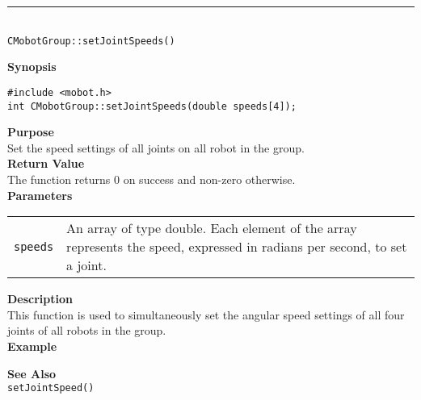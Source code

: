 \noindent
\vspace{5pt}
\rule{4.5in}{0.015in}\\
\noindent
{\LARGE \texttt{CMobotGroup::setJointSpeeds()}}\\
{}

\noindent
{\bf Synopsis}
\vspace{-8pt}
\begin{verbatim}
#include <mobot.h>
int CMobotGroup::setJointSpeeds(double speeds[4]);
\end{verbatim}

\noindent
{\bf Purpose}\\
Set the speed settings of all joints on all robot in the group.\\

\noindent
{\bf Return Value}\\
The function returns 0 on success and non-zero otherwise.\\

\noindent
{\bf Parameters}
\vspace{-0.1in}
\begin{description}
\item               
\begin{tabular}{p{10 mm}p{145 mm}}
\texttt{speeds} & An array of type double. Each element of the array
represents the speed, expressed in radians per second, to set a joint. \\
\end{tabular}
\end{description}

\noindent
{\bf Description}\\
This function is used to simultaneously set the angular speed settings of
all four joints of all robots in the group. \\

\noindent
{\bf Example}\\
\noindent

\noindent
{\bf See Also}\\
\texttt{setJointSpeed()}

